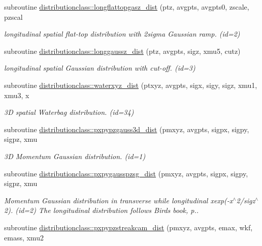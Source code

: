 \begin{DoxyCompactItemize}
subroutine \mbox{\hyperlink{namespacedistributionclass_a635c045c52b04bd03c076b8b8454b278}{distributionclass\+::longflattopgasz\+\_\+dist}} (ptz, avgpts, avgpts0, zscale, pzscal
\begin{DoxyCompactList}\small\item\em longitudinal spatial flat-\/top distribution with 2sigma Gaussian ramp. (id=2) \end{DoxyCompactList}\item 
subroutine \mbox{\hyperlink{namespacedistributionclass_ab34be02e18a0166b3b2c945e0f68b9ca}{distributionclass\+::longgaussz\+\_\+dist}} (ptz, avgpts, sigz, xmu5, cutz)
\begin{DoxyCompactList}\small\item\em longitudinal spatial Gaussian distribution with cut-\/off. (id=3) \end{DoxyCompactList}\item 
subroutine \mbox{\hyperlink{namespacedistributionclass_a2b070800bac220b6560be536eaa0d780}{distributionclass\+::waterxyz\+\_\+dist}} (ptxyz, avgpts, sigx, sigy, sigz, xmu1, xmu3, x
\begin{DoxyCompactList}\small\item\em 3D spatial Waterbag distribution. (id=34) \end{DoxyCompactList}\item 
subroutine \mbox{\hyperlink{namespacedistributionclass_a93a16b51a7754d6ec2c99d0a8c4f5ced}{distributionclass\+::pxpypzgauss3d\+\_\+dist}} (pmxyz, avgpts, sigpx, sigpy, sigpz, xmu
\begin{DoxyCompactList}\small\item\em 3D Momentum Gaussian distribution. (id=1) \end{DoxyCompactList}\item 
subroutine \mbox{\hyperlink{namespacedistributionclass_ab6dde242aa247f41d9581455e84607fb}{distributionclass\+::pxpygausspzsg\+\_\+dist}} (pmxyz, avgpts, sigpx, sigpy, sigpz, xmu
\begin{DoxyCompactList}\small\item\em Momentum Gaussian distribution in transverse while longitudinal xexp(-\/x$^\wedge$2/sigz$^\wedge$2). (id=2) The longitudinal distribution follows Bird\textquotesingle{}s book, p.. \end{DoxyCompactList}\item 
subroutine \mbox{\hyperlink{namespacedistributionclass_a323470431d5dda05b3dd2ba27cf8565c}{distributionclass\+::pxpypzstreakcam\+\_\+dist}} (pmxyz, avgpts, emax, wkf, emass, xmu2

\end{DoxyCompactItemize}
